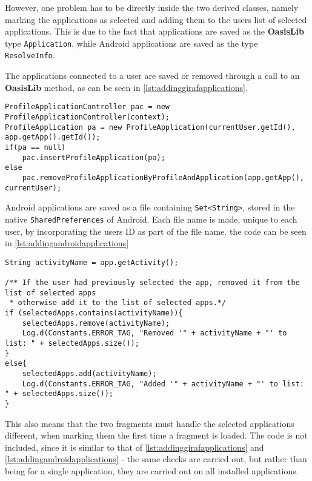 However, one problem has to be directly inside the two derived classes, namely marking the applications as selected and adding them to the users list of selected applications.
This is due to the fact that \giraf applications are saved as the \textbf{OasisLib} type \lstinline!Application!, while Android applications are saved as the type \lstinline!ResolveInfo!.

The \giraf applications connected to a user are saved or removed through a call to an \textbf{OasisLib} method, as can be seen in \cref{lst:addinggirafapplications}.

\begin{lstlisting}[caption={The methods used for adding or removing a Giraf application to a user}, label={lst:addinggirafapplications}]
ProfileApplicationController pac = new ProfileApplicationController(context);
ProfileApplication pa = new ProfileApplication(currentUser.getId(), app.getApp().getId());
if(pa == null)
	pac.insertProfileApplication(pa);
else
	pac.removeProfileApplicationByProfileAndApplication(app.getApp(), currentUser);
\end{lstlisting}

Android applications are saved as a file containing \lstinline!Set<String>!, stored in the native \lstinline!SharedPreferences! of Android.
Each file name is made, unique to each user, by incorporating the users ID as part of the file name.
the code can be seen in \cref{lst:addingandroidapplications}\\

\begin{lstlisting}[caption={The methods used for adding or removing a Giraf application to a user}, label={lst:addingandroidapplications}]
String activityName = app.getActivity();

/** If the user had previously selected the app, removed it from the list of selected apps
 * otherwise add it to the list of selected apps.*/
if (selectedApps.contains(activityName)){
    selectedApps.remove(activityName);
    Log.d(Constants.ERROR_TAG, "Removed '" + activityName + "' to list: " + selectedApps.size());
}
else{
    selectedApps.add(activityName);
    Log.d(Constants.ERROR_TAG, "Added '" + activityName + "' to list: " + selectedApps.size());
}
\end{lstlisting}

This also means that the two fragments must handle the selected applications different, when marking them the first time a fragment is loaded.
The code is not included, since it is similar to that of \cref{lst:addinggirafapplications} and \cref{lst:addingandroidapplications} - the same checks are carried out, but rather than being for a single application, they are carried out on all installed applications.